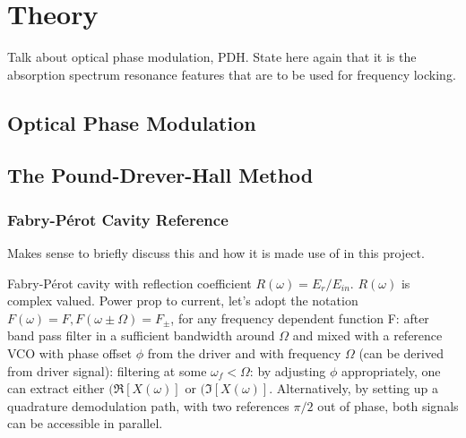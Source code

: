 \newpage
\section{Theory} \label{sec:theory}

Talk about optical phase modulation, PDH. State here again that it is the absorption spectrum resonance features that are to be used for frequency locking.

\subsection{Optical Phase Modulation}

\subsection{The Pound-Drever-Hall Method}

\subsubsection{Fabry-P{\'e}rot Cavity Reference}

Makes sense to briefly discuss this and how it is made use of in this project.

Fabry-P{\'e}rot cavity with reflection coefficient $R(\omega)=E_{r}/E_{in}$.
$R(\omega)$ is complex valued. Power prop to current, let's adopt the notation $F(\omega) = F, F(\omega \pm \Omega) = F_\pm$, for any frequency dependent function F:
after band pass filter in a sufficient bandwidth around $\Omega$ and mixed with a reference VCO with phase offset $\phi$ from the driver and with frequency $\Omega$ (can be derived from driver signal):
filtering at some $\omega_f < \Omega$:
by adjusting $\phi$ appropriately, one can extract either $(\Re[X(\omega)]$ or $(\Im[X(\omega)]$. Alternatively, by setting up a quadrature demodulation path, with two references $\pi/2$ out of phase, both signals can be accessible in parallel.

